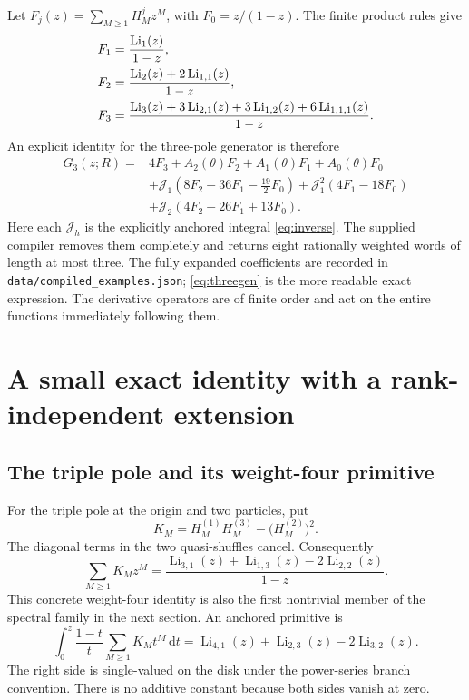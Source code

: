 \documentclass[11pt,letterpaper]{article}
\numberwithin{equation}{section}
\theoremstyle{definition}\newtheorem{definition}[theorem]{Definition}
\theoremstyle{remark}\newtheorem{remark}[theorem]{Remark}
\newcommand{\dd}{\,\mathrm d}\newcommand{\Li}{\operatorname{Li}}
\newcommand{\src}[1]{\nolinkurl{#1}}
\begin{document}
Let $F_j(z)=\sum_{M\ge1}H_M^jz^M$, with $F_0=z/(1-z)$.
The finite product rules give
\begin{align}
 F_1&=\frac{\Li_1(z)}{1-z},\notag\\
 F_2&=\frac{\Li_2(z)+2\Li_{1,1}(z)}{1-z},\notag\\
 F_3&=\frac{\Li_3(z)+3\Li_{2,1}(z)+3\Li_{1,2}(z)
                           +6\Li_{1,1,1}(z)}{1-z}.
 \label{eq:F123}
\end{align}
An explicit identity for the three-pole generator is therefore
\begin{equation}\label{eq:threegen}
 \begin{split}
 G_3(z;R)={}&4F_3+A_2(\theta)F_2+A_1(\theta)F_1+A_0(\theta)F_0\\
 &+\mathcal J_1(8F_2-36F_1-\tfrac{19}2F_0)
    +\mathcal J_1^2(4F_1-18F_0)\\
 &+\mathcal J_2(4F_2-26F_1+13F_0).
 \end{split}
\end{equation}
Here each $\mathcal J_h$ is the explicitly anchored integral
\eqref{eq:inverse}. The supplied compiler removes them completely and
returns eight rationally weighted words of length at most three. The
fully expanded coefficients are recorded in
\src{data/compiled_examples.json}; \eqref{eq:threegen} is the more
readable exact expression. The derivative operators are of finite
order and act on the entire functions immediately following them.

\section{A small exact identity with a rank-independent extension}

\subsection{The triple pole and its weight-four primitive}

For the triple pole at the origin and two particles, put
\begin{equation}\label{eq:KM}
 K_M=H_M^{(1)}H_M^{(3)}-\bigl(H_M^{(2)}\bigr)^2.
\end{equation}
The diagonal terms in the two quasi-shuffles cancel. Consequently
\begin{equation}\label{eq:Kgen}
 \boxed{\displaystyle
 \sum_{M\ge1}K_Mz^M=
 \frac{\Li_{3,1}(z)+\Li_{1,3}(z)-2\Li_{2,2}(z)}{1-z}.}
\end{equation}
This concrete weight-four identity is also the first nontrivial member
of the spectral family in the next section. An anchored primitive is
\begin{equation}\label{eq:Kprimitive}
 \int_0^z\frac{1-t}{t}\sum_{M\ge1}K_Mt^M\dd t
           =\Li_{4,1}(z)+\Li_{2,3}(z)-2\Li_{3,2}(z).
\end{equation}
The right side is single-valued on the disk under the power-series
branch convention. There is no additive constant because both sides
vanish at zero.
\end{document}
